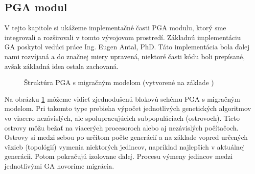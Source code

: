 \subsection{PGA modul}
V tejto kapitole si ukážeme implementačné časti PGA modulu, ktorý sme integrovali a rozširovali v tomto vývojovom prostredí.
Základnú implementáciu GA poskytol vedúci práce Ing. Eugen Antal, PhD.
Táto implementácia bola ďalej nami rozvíjaná a do značnej miery upravená, niektoré časti kódu boli prepísané, avšak základná idea ostala zachovaná.

\begin{figure}[!htbp]
  \centering
  
  \caption{Štruktúra PGA s migračným modelom (vytvorené na základe \cite{pea})}
  \label{img:pga}
\end{figure}

Na obrázku \ref{img:pga} môžeme vidieť zjednodušenú blokovú schému PGA s migračným modelom.
Pri takomto type prebieha výpočet jednotlivých genetických algoritmov vo viacero nezávislých, ale spolupracujúcich subpopuláciach (ostrovoch).
Tieto ostrovy môžu bežať na viacerých procesoroch alebo aj nezávislých počítačoch.
Ostrovy si medzi sebou po určitom počte generácií a na základe vopred určených väzieb (topológií) vymenia niektorých jedincov,
napríklad najlepších v aktuálnej generácii. Potom pokračujú izolovane ďalej.
Procesu výmeny jedincov medzi jednotlivými GA hovoríme migrácia.

